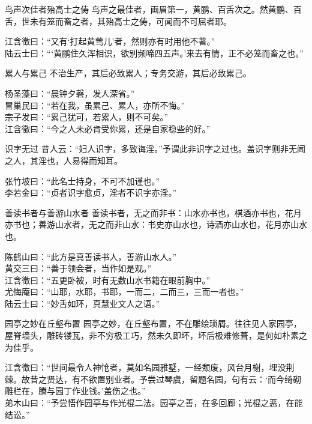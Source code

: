 \begin{yulu}{鸟声次佳者殆高士之俦}
鸟声之最佳者，画眉第一，黄鹂、百舌次之。然黄鹂、百舌，世未有笼而畜之者，其殆高士之俦，可闻而不可屈者耶。
\begin{comments}
江含徵曰：“又有‘打起黄莺儿’者，然则亦有时用他不著。” \\
陆云士曰：“‘黄鹂住久浑相识，欲别频啼四五声。’来去有情，正不必笼而畜之也。”
\end{comments}
\end{yulu}

\begin{yulu}{累人与累己}
不治生产，其后必致累人；专务交游，其后必致累己。
\begin{comments}
杨圣藻曰：“晨钟夕磬，发人深省。” \\
冒巢民曰：“若在我，虽累己、累人，亦所不悔。” \\
宗子发曰：“累己犹可，若累人，则不可矣。” \\
江含徵曰：“今之人未必肯受你累，还是自家稳些的好。”
\end{comments}
\end{yulu}

\begin{yulu}{识字无过}
昔人云：“妇人识字，多致诲淫。”予谓此非识字之过也。盖识字则非无闻之人，其淫也，人易得而知耳。
\begin{comments}
张竹坡曰：“此名士持身，不可不加谨也。” \\
李若金曰：“贞者识字愈贞，淫者不识字亦淫。”
\end{comments}
\end{yulu}

\begin{yulu}{善读书者与善游山水者}
善读书者，无之而非书：山水亦书也，棋酒亦书也，花月亦书也；善游山水者，无之而非山水：书史亦山水也，诗酒亦山水也，花月亦山水也。
\begin{comments}
陈鹤山曰：“此方是真善读书人，善游山水人。” \\
黄交三曰：“善于领会者，当作如是观。” \\
江含徵曰：“五更卧被，时有无数山水书籍在眼前胸中。” \\
尤悔庵曰：“山耶，水耶，书耶，一而二，二而三，三而一者也。” \\
陆云士曰：“妙舌如环，真慧业文人之语。”
\end{comments}
\end{yulu}

\begin{yulu}{园亭之妙在丘壑布置}
园亭之妙，在丘壑布置，不在雕绘琐屑。往往见人家园亭，屋脊墙头，雕砖镂瓦，非不穷极工巧，然未久即坏，坏后极难修葺，是何如朴素之为佳乎。
\begin{comments}
江含徵曰：“世间最令人神怆者，莫如名园雅墅，一经颓废，风台月榭，埋没荆棘。故昔之贤达，有不欲置别业者。予尝过琴虞，留题名园，句有云：‘而今绮砌雕栏在，賸与园丁作业钱。’盖伤之也。” \\
弟木山曰：“予尝悟作园亭与作光棍二法。园亭之善，在多回廊；光棍之恶，在能结讼。”
\end{comments}
\end{yulu}

